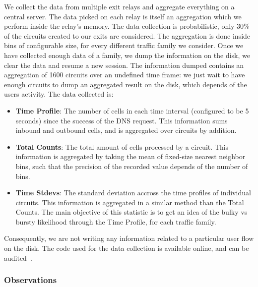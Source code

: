 We collect the data from multiple exit relays and aggregate everything on a central server. The data picked on each relay is itself an aggregation which we perform inside the relay's memory. The data collection is probabilistic, only 30\% of the circuits created to our exits are considered. The aggregation is done inside bins of configurable size, for every different traffic family we consider. Once we have collected enough data of a family, we dump the information on the disk, we clear the data and resume a new session. The information dumped contains an aggregation of 1600 circuits over an undefined time frame: we just wait to have enough circuits to dump an aggregated result on the disk, which depends of the users activity. The data collected is:
\begin{itemize}
	\item \textbf{Time Profile}: The number of cells in each time interval (configured to be 5 seconds) since the success of the DNS request. This information sums inbound and outbound cells, and is aggregated over circuits by addition.
	\item \textbf{Total Counts}: The total amount of cells processed by a circuit. This information is aggregated by taking the mean of fixed-size nearest neighbor bins, such that the precision of the recorded value depends of the number of bins.
	\item \textbf{Time Stdevs}: The standard deviation accross the time profiles of individual circuits. This information is aggregated in a similar method than the Total Counts. The main objective of this statistic is to get an idea of the bulky vs bursty likelihood through the Time Profile, for each traffic family.
\end{itemize}
Consequently, we are not writing any information related to a particular user flow on the disk. The code used for the data collection is available online, and can be audited~\cite{code-mt_stats}.

\subsubsection{Observations}

